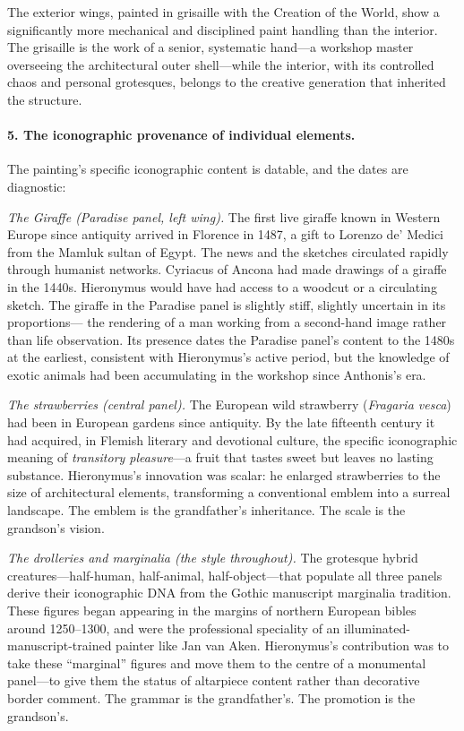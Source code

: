 The exterior wings, painted in grisaille with the Creation of the World,
show a significantly more mechanical and disciplined paint handling than
the interior.  The grisaille is the work of a senior, systematic hand---a
workshop master overseeing the architectural outer shell---while the
interior, with its controlled chaos and personal grotesques, belongs to
the creative generation that inherited the structure.

\paragraph{5. The iconographic provenance of individual elements.}

The painting's specific iconographic content is datable, and the dates are
diagnostic:

\medskip

\textit{The Giraffe (Paradise panel, left wing).}  The first live giraffe
known in Western Europe since antiquity arrived in Florence in 1487, a
gift to Lorenzo de' Medici from the Mamluk sultan of Egypt.  The news and
the sketches circulated rapidly through humanist networks.  Cyriacus of
Ancona had made drawings of a giraffe in the 1440s.  Hieronymus would have
had access to a woodcut or a circulating sketch.  The giraffe in the
Paradise panel is slightly stiff, slightly uncertain in its proportions---
the rendering of a man working from a second-hand image rather than life
observation.  Its presence dates the Paradise panel's content to the 1480s
at the earliest, consistent with Hieronymus's active period, but the
knowledge of exotic animals had been accumulating in the workshop since
Anthonis's era.

\medskip

\textit{The strawberries (central panel).}  The European wild strawberry
(\textit{Fragaria vesca}) had been in European gardens since antiquity.
By the late fifteenth century it had acquired, in Flemish literary and
devotional culture, the specific iconographic meaning of \textit{transitory
pleasure}---a fruit that tastes sweet but leaves no lasting substance.
Hieronymus's innovation was scalar: he enlarged strawberries to the size
of architectural elements, transforming a conventional emblem into a
surreal landscape.  The emblem is the grandfather's inheritance.  The
scale is the grandson's vision.

\medskip

\textit{The drolleries and marginalia (the style throughout).}  The
grotesque hybrid creatures---half-human, half-animal, half-object---that
populate all three panels derive their iconographic DNA from the Gothic
manuscript marginalia tradition.  These figures began appearing in the
margins of northern European bibles around 1250--1300, and were the
professional speciality of an illuminated-manuscript-trained painter like
Jan van Aken.  Hieronymus's contribution was to take these ``marginal''
figures and move them to the centre of a monumental panel---to give them
the status of altarpiece content rather than decorative border comment.
The grammar is the grandfather's.  The promotion is the grandson's.

